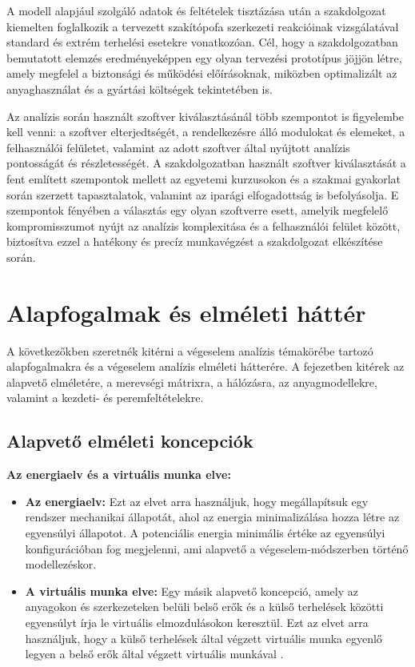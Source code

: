 \documentclass[12pt,a4paper,oneside]{report}
\begin{document}
A modell alapjául szolgáló adatok és feltételek tisztázása után a szakdolgozat kiemelten foglalkozik a tervezett szakítópofa szerkezeti reakcióinak vizsgálatával standard és extrém terhelési esetekre vonatkozóan. Cél, hogy a szakdolgozatban bemutatott elemzés eredményeképpen egy olyan tervezési prototípus jöjjön létre, amely megfelel a biztonsági és működési előírásoknak, miközben optimalizált az anyaghasználat és a gyártási költségek tekintetében is.

Az analízis során használt szoftver kiválasztásánál több szempontot is figyelembe kell venni: a szoftver elterjedtségét, a rendelkezésre álló modulokat és elemeket, a felhasználói felületet, valamint az adott szoftver által nyújtott analízis pontosságát és részletességét. A szakdolgozatban használt szoftver kiválasztását a fent említett szempontok mellett az egyetemi kurzusokon és a szakmai gyakorlat során szerzett tapasztalatok, valamint az iparági elfogadottság is befolyásolja. E szempontok fényében a választás egy olyan szoftverre esett, amelyik megfelelő kompromisszumot nyújt az analízis komplexitása és a felhasználói felület között, biztosítva ezzel a hatékony és precíz munkavégzést a szakdolgozat elkészítése során.

\section{Alapfogalmak és elméleti háttér}
A következőkben szeretnék kitérni a végeselem analízis témakörébe tartozó alapfogalmakra és a végeselem analízis elméleti hátterére. A fejezetben kitérek az alapvető elméletére, a merevségi mátrixra, a hálózásra, az anyagmodellekre, valamint a kezdeti- és peremfeltételekre.
\subsection{Alapvető elméleti koncepciók}
\textbf{Az energiaelv és a virtuális munka elve:}
\begin{itemize}
    \item \textbf{Az energiaelv:} Ezt az elvet arra használjuk, hogy megállapítsuk egy rendszer mechanikai állapotát, ahol az energia minimalizálása hozza létre az egyensúlyi állapotot. A potenciális energia minimális értéke az egyensúlyi konfigurációban fog megjelenni, ami alapvető a végeselem-módszerben történő modellezéskor.
    \item \textbf{A virtuális munka elve:} Egy másik alapvető koncepció, amely az anyagokon és szerkezeteken belüli belső erők és a külső terhelések közötti egyensúlyt írja le virtuális elmozdulásokon keresztül. Ezt az elvet arra használjuk, hogy a külső terhelések által végzett virtuális munka egyenlő legyen a belső erők által végzett virtuális munkával \cite{voros2012veges,pere2011vem}.
\end{itemize}
\newpage
\end{document}
